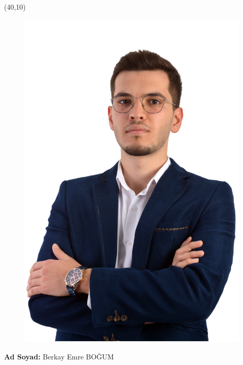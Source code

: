 \vspace{10mm}

\newsavebox{\mysquare}
\savebox{\mysquare}{\textcolor{black}{\rule[2.3pt]{3.4pt}{3.4pt}}}

\setlength{\TPHorizModule}{10pt}
\setlength{\TPVertModule}{10pt}
\begin{textblock}{1}(40,10)
 \begin{figure}[p]
 \includegraphics[scale=0.25,keepaspectratio=true]{./fig/BerkayCV}
\end{figure}

\end{textblock}
\textbf{Ad Soyad:} Berkay Emre BOĞUM\\

